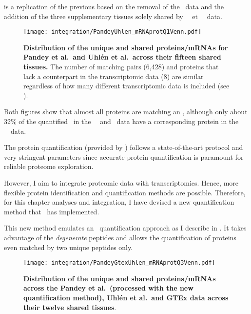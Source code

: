  is a replication of the previous 
based on the removal of the \gtex\ data
and the addition of the three supplementary tissues solely shared
by \pandey\ \etal\ et \uhlen\ \etal\ data.%

\begin{figure}[!htb]
    \texttt{[image: integration/PandeyUhlen\_mRNAprotQ1Venn.pdf]}\centering
    \vspace{-3.5mm}
    \caption[Distribution of the unique and shared proteins/mRNAs for Pandey et al.\
    and Uhlén et al.\ across fifteen tissues.]{%
    \label{fig:PU_vennQ1}\textbf{Distribution of the unique and shared proteins/mRNAs
    for Pandey et al.\ and Uhlén et al.\ across their fifteen shared tissues.}
    The number of matching pairs (6,428) and proteins that lack a counterpart in
    the transcriptomic data (8) are similar regardless of how many different
    transcriptomic data is included (see \Cref{fig:PGU_vennQ1}).}
\end{figure}

Both figures show that almost all proteins are matching an \mRNA{},
although only about 32\% of the quantified \mRNAs\
in the \uhlen\ \etal\ and \gtex\ data
have a corresponding protein in the \pandey\ \etal\ data.

The protein quantification (provided by \james) follows
a state-of-the-art protocol and very stringent parameters
since accurate protein quantification is paramount for reliable proteome exploration.

However, I aim to integrate proteomic data with transcriptomics.
Hence, more flexible protein identification and quantification methods are possible.
Therefore, for this chapter analyses and integration,
I have devised a new quantification method that \james\ has implemented.%

This new method emulates an \Rnaseq\ quantification approach
as I describe in .
It takes advantage of the \emph{degenerate} peptides
and allows the quantification of proteins even matched by two unique peptides only.\\
\vspace{-\baselineskip}

\begin{figure}[!ht]
    \texttt{[image: integration/PandeyGtexUhlen\_mRNAprotQ3Venn.pdf]}\centering
    \vspace{-4mm}
    \caption[Distribution of the unique and shared proteins/mRNAs
    across the three datasets and twelve tissues
    (with the new protein quantification method)]{\label{fig:PGU_venQ3}%
    \textbf{Distribution of the unique and shared proteins/mRNAs
    across the Pandey et al.\ (processed with the new quantification method),
    Uhlén et al.\ and GTEx data across their twelve shared tissues}.
    }
\end{figure}

